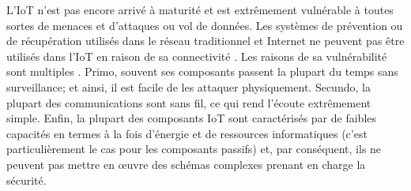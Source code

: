 L'IoT n'est pas encore arrivé à maturité et est extrêmement vulnérable à toutes sortes de menaces et d'attaques ou vol de données. Les systèmes de prévention ou de récupération utilisés dans le réseau traditionnel et Internet ne peuvent pas être utilisés dans l'IoT en raison de sa connectivité \cite{hu2016security}. Les raisons de sa vulnérabilité sont multiples \cite{atzori2010iot}. Primo, souvent ses composants passent la plupart du temps sans surveillance; et ainsi, il est facile de les attaquer physiquement. Secundo, la plupart des communications sont sans f{\kern0pt}il, ce qui rend l'écoute extrêmement simple. Enf{\kern0pt}in, la plupart des composants IoT sont caractérisés par de faibles capacités en termes à la fois d'énergie et de ressources informatiques (c'est particulièrement le cas pour les composants passifs) et, par conséquent, ils ne peuvent pas mettre en œuvre des schémas complexes prenant en charge la sécurité.


